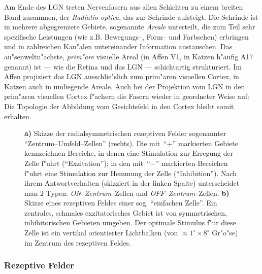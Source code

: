 Am Ende des LGN treten Nervenfasern aus allen Schichten zu einem breiten
Band zusammen, der \emph{Radiatio optica}, das zur Sehrinde aufsteigt.  Die
Sehrinde ist in mehrere abgegrenzete Gebiete, sogenannte \emph{Areale}
unterteilt, die zum Teil sehr spezifische Leistungen (wie z.B.
Bewegungs--, Form-- und Farbsehen) erbringen und in zahlreichen Kan"alen
untereinander Information austauschen.  Das au"senweltn"achste,
\emph{prim"are} visuelle Areal (in Affen V1, in Katzen h"aufig A17 genannt)
ist --- wie die Retina und das LGN --- schichtartig strukturiert.  Im Affen
projiziert das LGN ausschlie"slich zum prim"aren visuellen Cortex, in
Katzen auch in umliegende Areale.  Auch bei der Projektion vom LGN in den
prim"aren visuellen Cortex f"achern die Fasern wieder in geordneter Weise
auf: Die Topologie der Abbildung vom Gesichtsfeld in den Cortex bleibt
somit erhalten.

\begin{figure}[t]
\begin{center}
\begin{minipage}[m]{5cm}
\end{minipage}
\hskip1cm
\begin{minipage}[m]{6cm}
\end{minipage}
\end{center}
\caption{\textbf{a)} Skizze der radialsymmetrischen rezeptiven Felder
sogenannter ``Zentrum--Umfeld--Zellen'' (rechts). Die mit~``$+$''
markierten Gebiete kennzeichnen Bereiche, in denen eine Stimulation zur
Erregung der Zelle f"uhrt (``Exzitation''); in den mit~``$-$'' markierten
Bereichen f"uhrt eine Stimulation zur Hemmung der Zelle
(``Inhibition''). Nach ihrem Antwortverhalten (skizziert in der linken
Spalte) unterscheidet man 2 Typen: \emph{ON--Zentrum}--Zellen und
\emph{OFF--Zentrum}--Zellen. \textbf{b)} Skizze eines rezeptiven Feldes
einer sog. ``einfachen Zelle''. Ein zentrales, schmales exzitatorisches
Gebiet ist von symmetrischen, inhibitorischen Gebieten umgeben. Der
optimale Stimulus f"ur diese Zelle ist ein vertikal orientierter
Lichtbalken (von $\approx1^\circ\times 8^\circ$ Gr"o"se) im Zentrum des
rezeptiven Feldes.}
\label{rfsimple}
\end{figure}

\subsubsection{Rezeptive Felder}
\label{rf}

